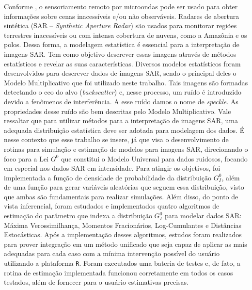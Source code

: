 \documentclass[tcc]{ic}
\begin{document}
\begin{agradecimentos}
\begin{resumo}
Conforme \citet{FreryMinute2004}, o sensoriamento remoto por microondas pode ser usado para obter informações sobre cenas inacessíveis e/ou não observáveis.
Radares de abertura sintética (SAR -- \textit{Synthetic Aperture Radar}) são usados para monitorar regiões terrestres inacessíveis ou com intensa cobertura de nuvens, como a Amazônia e os polos.
%
Dessa forma, a modelagem estatística é essencial para a interpretação de imagens SAR. 
Tem como objetivo descrever essas imagens através de métodos estatísticos e revelar as suas características. 
Diversos modelos estatísticos foram desenvolvidos para descrever dados de imagens SAR, sendo o principal deles o Modelo Multiplicativo que foi utilizado neste trabalho. 
Tais imagens são formadas detectando o eco do alvo (\textit{backscatter}) e, nesse processo, um ruído é introduzido devido a fenômenos de interferência. 
A esse ruído damos o nome de \textit{speckle}. 
As propriedades desse ruído são bem descritas pelo Modelo Multiplicativo.
%
Vale ressaltar que para utilizar métodos para a interpretação de imagens SAR, uma adequada distribuição estatística deve ser adotada para modelagem dos dados. 
É nesse contexto que esse trabalho se insere, já que visa o desenvolvimento de rotinas para simulação e estimação de modelos para imagens SAR, direcionando o foco para a Lei $G^{0}$ que constitui o Modelo Universal para dados ruidosos, focando em especial nos dados SAR em intensidade.
%
Para atingir os objetivos, foi implementada a função de densidade de probabilidade da distribuição $G_I^0$, além de uma função para gerar variáveis aleatórias que seguem essa distribuição, visto que ambas são fundamentais para realizar simulações. 
Além disso, do ponto de vista inferencial, foram estudados e implementados quatro algoritmos de estimação do parâmetro que indexa a distribuição $G_I^{0}$ para modelar dados SAR: Máxima Verossimilhança, Momentos Fracionários, Log-Cumulantes e Distâncias Estocásticas.
%
Após a implementação desses algoritmos, estudos foram realizados para prover integração em um método unificado que seja capaz de aplicar as mais adequadas para cada caso com a mínima intervenção possível do usuário utilizando a plataforma \texttt{R}. 
Foram executados uma bateria de testes e, de fato, a rotina de estimação implementada funcionou corretamente em todos os casos testados, além de fornecer para o usuário estimativas precisas.


\end{resumo}
\end{agradecimentos}
\end{document}
